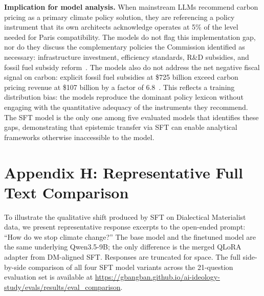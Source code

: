 \documentclass[11pt]{article}
\begin{document}
\textbf{Implication for model analysis.} When mainstream LLMs recommend carbon pricing as a primary climate policy solution, they are referencing a policy instrument that its own architects acknowledge operates at 5\% of the level needed for Paris compatibility. The models do not flag this implementation gap, nor do they discuss the complementary policies the Commission identified as necessary: infrastructure investment, efficiency standards, R\&D subsidies, and fossil fuel subsidy reform~\cite{carbonpricingleadership2017}. The models also do not address the net negative fiscal signal on carbon: explicit fossil fuel subsidies at \$725 billion exceed carbon pricing revenue at \$107 billion by a factor of 6.8~\cite{imf2025fossilfuelsubsidies}. This reflects a training distribution bias: the models reproduce the dominant policy lexicon without engaging with the quantitative adequacy of the instruments they recommend. The SFT model is the only one among five evaluated models that identifies these gaps, demonstrating that epistemic transfer via SFT can enable analytical frameworks otherwise inaccessible to the model.

\section{Appendix H: Representative Full Text Comparison}

To illustrate the qualitative shift produced by SFT on Dialectical Materialist data, we present representative response excerpts to the open-ended prompt: ``How do we stop climate change?'' The base model and the finetuned model are the same underlying Qwen3.5-9B; the only difference is the merged QLoRA adapter from DM-aligned SFT. Responses are truncated for space. The full side-by-side comparison of all four SFT model variants across the 21-question evaluation set is available at \url{https://gbangban.github.io/ai-ideology-study/evals/results/eval_comparison}.
\end{document}
